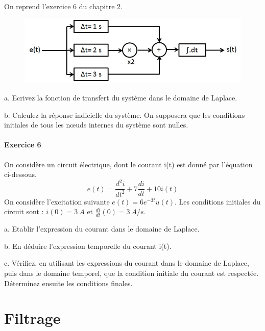 \documentclass[]{report}
\begin{document}
	On reprend l'exercice 6 du chapitre 2.

	
	\begin{figure}[h!]
		\centering
		\includegraphics[scale=0.5]{images/Exo_2_6.jpg} 
	\end{figure}
	
	a. Ecrivez la fonction de transfert du système dans le domaine de Laplace.
	
	b. Calculez la réponse indicielle du système. On supposera que les conditions initiales de tous les nœuds internes du système sont nulles. 
	
	
	\vspace{1\baselineskip}
	
	\subsubsection{Exercice 6}
	
	On considère un circuit électrique, dont le courant i(t) est donné par l'équation ci-dessous.
	\begin{equation*}
	e(t)=\frac{d^{2}i}{dt^{2}}+7\frac{di}{dt}+10i(t)
	\end{equation*}
	On considère l'excitation suivante $e(t)=6e^{-3t}u(t)$. Les conditions initiales du circuit sont : $i(0) = 3~A$ et $\frac{di}{dt}(0)=3~A/s$.
	
	
	a. Etablir l'expression du courant dans le domaine de Laplace.
	
	b. En déduire l'expression temporelle du courant i(t).
	
	c. Vérifiez, en utilisant les expressions du courant dans le domaine de Laplace, puis dans le domaine temporel, que la condition initiale du courant est respectée. Déterminez ensuite les conditions finales. 
	
	\vspace{1\baselineskip}
	
	
	
	
	
	\newpage
	
	
	
	
\chapter{Filtrage}
\end{document}
